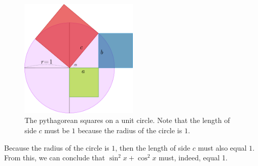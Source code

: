 \begin{figure}[H]
  \begin{center}
    \includegraphics[width=0.5\textwidth]{continuous/trig/pythcircle.eps}
    \caption{The pythagorean squares on a unit circle. Note that the length of side $c$ must be $1$ because the radius of the circle is $1$.}
  \end{center}
  \label{fig:pythcircle}
\end{figure}
Because the radius of the circle is $1$, then the length of side $c$ must also equal $1$.
From this, we can conclude that $\sin^2x+\cos^2x$ must, indeed, equal 1.


